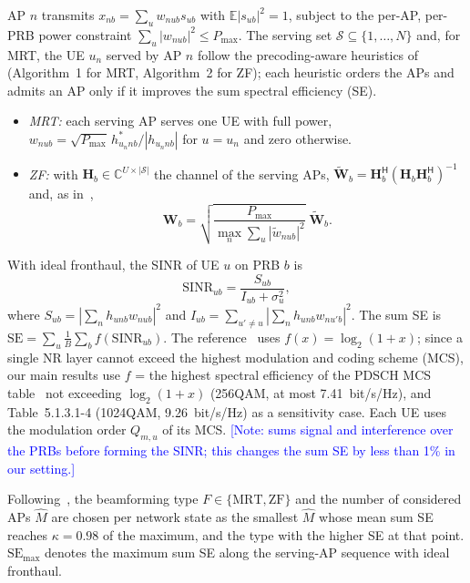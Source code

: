 \documentclass[10pt, final, journal, letterpaper, twocolumn]{IEEEtran}
\newcommand{\note}[1]{\textcolor{blue}{[Note: #1]}}
\begin{document}
AP $n$ transmits $x_{nb} = \sum_{u} w_{nub} s_{ub}$ with $\mathbb{E}|s_{ub}|^2=1$, subject to the per-AP, per-PRB power constraint $\sum_u |w_{nub}|^2\le P_{\max}$. The serving set $\mathcal{S}\subseteq\{1,\dots,N\}$ and, for MRT, the UE $u_n$ served by AP $n$ follow the precoding-aware heuristics of~\cite{girycki2024twc} (Algorithm~1 for MRT, Algorithm~2 for ZF); each heuristic orders the APs and admits an AP only if it improves the sum spectral efficiency (SE).
\begin{itemize}
  \item \emph{MRT:} each serving AP serves one UE with full power, $w_{nub} = \sqrt{P_{\max}}\, h^*_{u_n nb}/|h_{u_n nb}|$ for $u=u_n$ and zero otherwise.
  \item \emph{ZF:} with $\mathbf{H}_b\in\mathbb{C}^{U\times|\mathcal{S}|}$ the channel of the serving APs, $\tilde{\mathbf{W}}_b = \mathbf{H}_b^{\mathsf{H}}(\mathbf{H}_b\mathbf{H}_b^{\mathsf{H}})^{-1}$ and, as in~\cite[eq.~(18)]{girycki2024twc},
  \begin{equation}
    \mathbf{W}_b = \sqrt{\frac{P_{\max}}{\max_n \sum_u |\tilde w_{nub}|^2}}\;\tilde{\mathbf{W}}_b .
    \label{eq:zfnorm}
  \end{equation}
\end{itemize}
With ideal fronthaul, the SINR of UE $u$ on PRB $b$ is
\begin{equation}
  \mathrm{SINR}_{ub} = \frac{S_{ub}}{I_{ub}+\sigma_u^2},
  \label{eq:sinr}
\end{equation}
where $S_{ub} = |\sum_{n} h_{unb} w_{nub}|^2$ and $I_{ub} = \sum_{u'\neq u}|\sum_n h_{unb} w_{nu'b}|^2$.
The sum SE is $\mathrm{SE} = \sum_u \frac{1}{B}\sum_b f(\mathrm{SINR}_{ub})$. The reference~\cite{girycki2024eucnc} uses $f(x)=\log_2(1+x)$; since a single NR layer cannot exceed the highest modulation and coding scheme (MCS), our main results use $f$ = the highest spectral efficiency of the PDSCH MCS table~\cite[Table~5.1.3.1-2]{ts38214} not exceeding $\log_2(1+x)$ (256QAM, at most 7.41~bit/s/Hz), and Table~5.1.3.1-4 (1024QAM, 9.26~bit/s/Hz) as a sensitivity case. Each UE uses the modulation order $Q_{m,u}$ of its MCS.
\note{\cite{girycki2024twc} sums signal and interference over the PRBs before forming the SINR; this changes the sum SE by less than 1\% in our setting.}

Following~\cite{girycki2024eucnc}, the beamforming type $F\in\{\mathrm{MRT},\mathrm{ZF}\}$ and the number of considered APs $\hat M$ are chosen per network state as the smallest $\hat M$ whose mean sum SE reaches $\kappa = 0.98$ of the maximum, and the type with the higher SE at that point. $\mathrm{SE}_{\max}$ denotes the maximum sum SE along the serving-AP sequence with ideal fronthaul.
\end{document}
